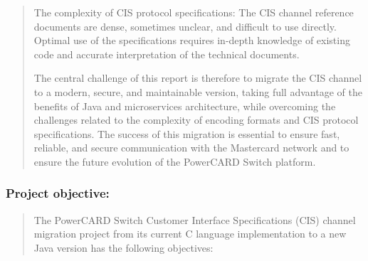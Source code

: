 \documentclass[12pt,a4paper]{report}
\begin{document}
\begin{quote}
The complexity of CIS protocol specifications: The CIS channel reference
documents are dense, sometimes unclear, and difficult to use directly.
Optimal use of the specifications requires in-depth knowledge of
existing code and accurate interpretation of the technical documents.

The central challenge of this report is therefore to migrate the CIS
channel to a modern, secure, and maintainable version, taking full
advantage of the benefits of Java and microservices architecture, while
overcoming the challenges related to the complexity of encoding formats
and CIS protocol specifications. The success of this migration is
essential to ensure fast, reliable, and secure communication with the
Mastercard network and to ensure the future evolution of the PowerCARD
Switch platform.
\end{quote}

\hypertarget{project-objective}{%
\subsubsection{\texorpdfstring{\textbf{Project
objective:}}{Project objective:}}\label{project-objective}}

\begin{quote}
The PowerCARD Switch Customer Interface Specifications (CIS) channel
migration project from its current C language implementation to a new
Java version has the following objectives:
\end{quote}
\end{document}
